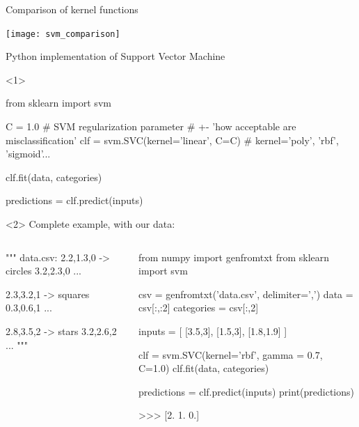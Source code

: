 \documentclass[compress]{beamer}
\begin{document}
\begin{frame}{Comparison of kernel functions}
    \begin{center}
        \texttt{[image: svm\_comparison]}
    \end{center}
\end{frame}

\begin{frame}[fragile]{Python implementation of Support Vector Machine}

\begin{onlyenv}<1>

\begin{pythoncode}
from sklearn import svm

C = 1.0  # SVM regularization parameter 
         # +- 'how acceptable are misclassification'
clf = svm.SVC(kernel='linear', C=C) # kernel='poly', 'rbf', 'sigmoid'...

clf.fit(data, categories)

predictions = clf.predict(inputs)
\end{pythoncode}

\end{onlyenv}

\begin{onlyenv}<2>
    Complete example, with our data:

\begin{columns}
    \begin{column}{0.4\linewidth}
\begin{pythoncode}
""" data.csv:
2.2,1.3,0 -> circles
3.2,2.3,0
...

2.3,3.2,1 -> squares
0.3,0.6,1
...

2.8,3.5,2 -> stars
3.2,2.6,2
...
"""
\end{pythoncode}
        
    \end{column}
    \begin{column}{0.6\linewidth}
\begin{pythoncode}
from numpy import genfromtxt
from sklearn import svm

csv = genfromtxt('data.csv', delimiter=',')
data = csv[:,:2]
categories = csv[:,2]


inputs = [ [3.5,3], [1.5,3], [1.8,1.9] ]

clf = svm.SVC(kernel='rbf',
              gamma = 0.7,
              C=1.0)
clf.fit(data, categories)

predictions = clf.predict(inputs)
print(predictions)

>>>  [2.  1.  0.]

\end{pythoncode}
    \end{column}
\end{columns}

\end{onlyenv}


\end{frame}
\end{document}
